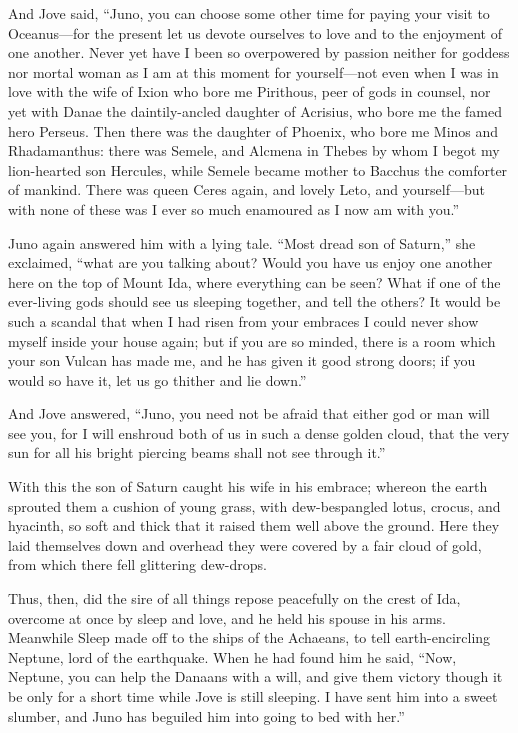 And Jove said, “Juno, you can choose some other time for paying your visit
to Oceanus—for the present let us devote ourselves to love and to
the enjoyment of one another. Never yet have I been so overpowered by
passion neither for goddess nor mortal woman as I am at this moment for
yourself—not even when I was in love with the wife of Ixion who bore
me Pirithous, peer of gods in counsel, nor yet with Danae the
daintily-ancled daughter of Acrisius, who bore me the famed hero Perseus.
Then there was the daughter of Phoenix, who bore me Minos and
Rhadamanthus: there was Semele, and Alcmena in Thebes by whom I begot my
lion-hearted son Hercules, while Semele became mother to Bacchus the
comforter of mankind. There was queen Ceres again, and lovely Leto, and
yourself—but with none of these was I ever so much enamoured as I
now am with you.”

Juno again answered him with a lying tale. “Most dread son of Saturn,” she
exclaimed, “what are you talking about? Would you have us enjoy one
another here on the top of Mount Ida, where everything can be seen? What
if one of the ever-living gods should see us sleeping together, and tell
the others? It would be such a scandal that when I had risen from your
embraces I could never show myself inside your house again; but if you are
so minded, there is a room which your son Vulcan has made me, and he has
given it good strong doors; if you would so have it, let us go thither and
lie down.”

And Jove answered, “Juno, you need not be afraid that either god or man
will see you, for I will enshroud both of us in such a dense golden cloud,
that the very sun for all his bright piercing beams shall not see through
it.”

With this the son of Saturn caught his wife in his embrace; whereon the
earth sprouted them a cushion of young grass, with dew-bespangled lotus,
crocus, and hyacinth, so soft and thick that it raised them well above the
ground. Here they laid themselves down and overhead they were covered by a
fair cloud of gold, from which there fell glittering dew-drops.

Thus, then, did the sire of all things repose peacefully on the crest of
Ida, overcome at once by sleep and love, and he held his spouse in his
arms. Meanwhile Sleep made off to the ships of the Achaeans, to tell
earth-encircling Neptune, lord of the earthquake. When he had found him he
said, “Now, Neptune, you can help the Danaans with a will, and give them
victory though it be only for a short time while Jove is still sleeping. I
have sent him into a sweet slumber, and Juno has beguiled him into going
to bed with her.”


